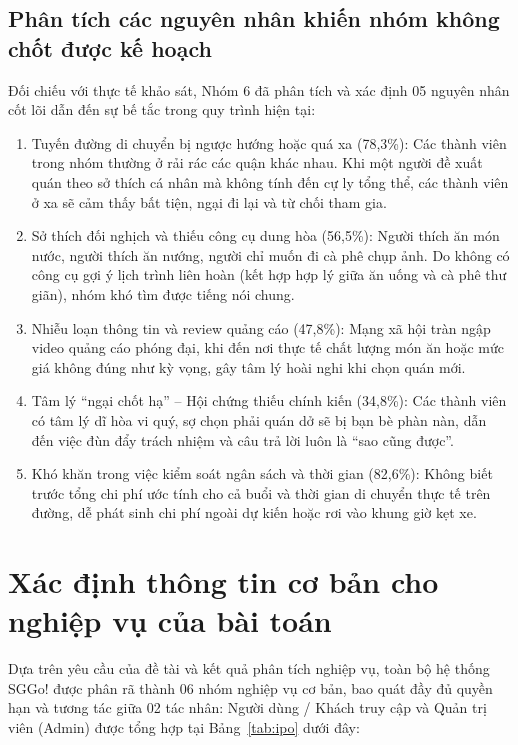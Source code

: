 \documentclass[13pt,a4paper]{extreport}
\begin{document}
\subsection{Phân tích các nguyên nhân khiến nhóm không chốt được kế hoạch}
Đối chiếu với thực tế khảo sát, Nhóm 6 đã phân tích và xác định 05 nguyên nhân cốt lõi dẫn đến sự bế tắc trong quy trình hiện tại:
\begin{enumerate}
    \item Tuyến đường di chuyển bị ngược hướng hoặc quá xa (78,3\%): Các thành viên trong nhóm thường ở rải rác các quận khác nhau. Khi một người đề xuất quán theo sở thích cá nhân mà không tính đến cự ly tổng thể, các thành viên ở xa sẽ cảm thấy bất tiện, ngại đi lại và từ chối tham gia.
    \item Sở thích đối nghịch và thiếu công cụ dung hòa (56,5\%): Người thích ăn món nước, người thích ăn nướng, người chỉ muốn đi cà phê chụp ảnh. Do không có công cụ gợi ý lịch trình liên hoàn (kết hợp hợp lý giữa ăn uống và cà phê thư giãn), nhóm khó tìm được tiếng nói chung.
    \item Nhiễu loạn thông tin và review quảng cáo (47,8\%): Mạng xã hội tràn ngập video quảng cáo phóng đại, khi đến nơi thực tế chất lượng món ăn hoặc mức giá không đúng như kỳ vọng, gây tâm lý hoài nghi khi chọn quán mới.
    \item Tâm lý ``ngại chốt hạ'' -- Hội chứng thiếu chính kiến (34,8\%): Các thành viên có tâm lý dĩ hòa vi quý, sợ chọn phải quán dở sẽ bị bạn bè phàn nàn, dẫn đến việc đùn đẩy trách nhiệm và câu trả lời luôn là ``sao cũng được''.
    \item Khó khăn trong việc kiểm soát ngân sách và thời gian (82,6\%): Không biết trước tổng chi phí ước tính cho cả buổi và thời gian di chuyển thực tế trên đường, dễ phát sinh chi phí ngoài dự kiến hoặc rơi vào khung giờ kẹt xe.
\end{enumerate}

\section{Xác định thông tin cơ bản cho nghiệp vụ của bài toán}

Dựa trên yêu cầu của đề tài và kết quả phân tích nghiệp vụ, toàn bộ hệ thống SGGo! được phân rã thành 06 nhóm nghiệp vụ cơ bản, bao quát đầy đủ quyền hạn và tương tác giữa 02 tác nhân: Người dùng / Khách truy cập và Quản trị viên (Admin) được tổng hợp tại Bảng~\ref{tab:ipo} dưới đây:
\end{document}
